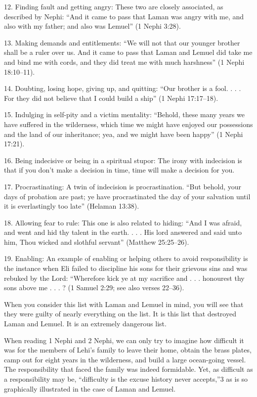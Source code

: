 \documentclass[letterpaper, 11pt]{report}
\begin{document}
12. Finding fault and getting angry: These two are closely associated, as described by Nephi: “And it came to pass that Laman was angry with me, and also with my father; and also was Lemuel” (1 Nephi 3:28).

13. Making demands and entitlements: “We will not that our younger brother shall be a ruler over us. And it came to pass that Laman and Lemuel did take me and bind me with cords, and they did treat me with much harshness” (1 Nephi 18:10–11).

14. Doubting, losing hope, giving up, and quitting: “Our brother is a fool. . . . For they did not believe that I could build a ship” (1 Nephi 17:17–18).

15. Indulging in self-pity and a victim ­mentality: “Behold, these many years we have suffered in the wilderness, which time we might have enjoyed our possessions and the land of our inheritance; yea, and we might have been happy” (1 Nephi 17:21).

16. Being indecisive or being in a spiritual ­stupor: The irony with indecision is that if you don’t make a decision in time, time will make a decision for you.

17. Procrastinating: A twin of indecision is ­procrastination. “But behold, your days of probation are past; ye have procrastinated the day of your salvation until it is everlastingly too late” (Helaman 13:38).

18. Allowing fear to rule: This one is also related to hiding: “And I was afraid, and went and hid thy talent in the earth. . . . His lord answered and said unto him, Thou wicked and slothful servant” (Matthew 25:25–26).

19. Enabling: An example of enabling or ­helping others to avoid responsibility is the instance when Eli failed to discipline his sons for their grievous sins and was rebuked by the Lord: “Wherefore kick ye at my sacrifice and . . . honourest thy sons above me . . . ? (1 Samuel 2:29; see also verses 22–36).

When you consider this list with Laman and Lemuel in mind, you will see that they were guilty of nearly everything on the list. It is this list that destroyed Laman and Lemuel. It is an extremely dangerous list.

When reading 1 Nephi and 2 Nephi, we can only try to imagine how difficult it was for the members of Lehi’s family to leave their home, obtain the brass plates, camp out for eight years in the wilderness, and build a large ocean-going vessel. The responsibility that faced the ­family was indeed formidable. Yet, as difficult as a responsibility may be, “difficulty is the excuse history never accepts,”3 as is so graphically illustrated in the case of Laman and Lemuel.
\end{document}
